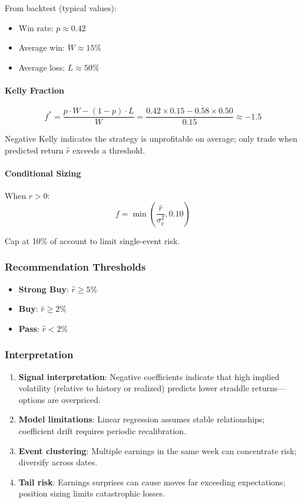 From backtest (typical values):
\begin{itemize}
  \item Win rate: $p \approx 0.42$
  \item Average win: $W \approx 15\%$
  \item Average loss: $L \approx 50\%$
\end{itemize}

\paragraph{Kelly Fraction}

\[
f^* = \frac{p \cdot W - (1-p) \cdot L}{W} = \frac{0.42 \times 0.15 - 0.58 \times 0.50}{0.15} \approx -1.5
\]

Negative Kelly indicates the strategy is unprofitable on average; only trade when predicted return $\hat{r}$ exceeds a threshold.

\paragraph{Conditional Sizing}

When $\hat{r} > 0$:
\[
f = \min\left(\frac{\hat{r}}{\sigma_{\hat{r}}^2}, 0.10\right)
\]

Cap at 10\% of account to limit single-event risk.

\subsubsection{Recommendation Thresholds}

\begin{itemize}
  \item \textbf{Strong Buy}: $\hat{r} \geq 5\%$
  \item \textbf{Buy}: $\hat{r} \geq 2\%$
  \item \textbf{Pass}: $\hat{r} < 2\%$
\end{itemize}

\subsubsection{Interpretation}

\begin{enumerate}
  \item \textbf{Signal interpretation}: Negative coefficients indicate that high implied volatility (relative to history or realized) predicts lower straddle returns---options are overpriced.

  \item \textbf{Model limitations}: Linear regression assumes stable relationships; coefficient drift requires periodic recalibration.

  \item \textbf{Event clustering}: Multiple earnings in the same week can concentrate risk; diversify across dates.

  \item \textbf{Tail risk}: Earnings surprises can cause moves far exceeding expectations; position sizing limits catastrophic losses.
\end{enumerate}

